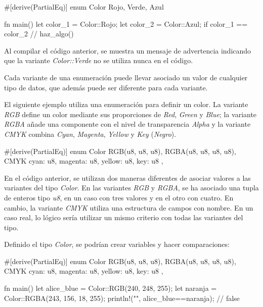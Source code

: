 \vspace{0.7em}
\begin{Codigo}
#[derive(PartialEq)]
enum Color {
   Rojo,
   Verde,
   Azul
}

fn main() {
   let color_1 = Color::Rojo;
   let color_2 = Color::Azul;  
   if color_1 == color_2 {
      // haz_algo()
   }
}
\end{Codigo} 

Al compilar el código anterior, se muestra un mensaje de advertencia indicando que la variante \textit{Color::Verde} no se utiliza nunca en el código. 

Cada variante de una enumeración puede llevar asociado un valor de cualquier tipo de datos, que además puede ser diferente para cada variante.

El siguiente ejemplo utiliza una enumeración para definir un color. La variante \textit{RGB} define un color mediante sus proporciones de \textit{Red}, \textit{Green} y \textit{Blue}; la variante \textit{RGBA} añade una componente con el nivel de transparencia \textit{Alpha} y la variante \textit{CMYK}  combina \textit{Cyan}, \textit{Magenta}, \textit{Yellow} y \textit{Key} (\textit{Negro}). 

\vspace{0.7em}
\begin{Codigo}
#[derive(PartialEq)]
enum Color {
   RGB(u8, u8, u8),
   RGBA(u8, u8, u8, u8),
   CMYK { cyan: u8, magenta: u8, yellow: u8, key: u8 },
}
\end{Codigo}

En el código anterior, se utilizan dos maneras diferentes de asociar valores a las variantes del tipo \textit{Color}. En las variantes \textit{RGB} y \textit{RGBA}, se ha asociado una tupla de enteros tipo \textit{u8}, en un caso con tres valores y en el otro con cuatro. En cambio, la variante \textit{CMYK} utiliza una estructura de campos con nombre. En un caso real, lo lógico sería utilizar un mismo criterio con todas las variantes del tipo.

Definido el tipo \textit{Color}, se podrían crear variables y hacer comparaciones:

\vspace{0.7em}
\begin{Codigo}
#[derive(PartialEq)]
enum Color {
   RGB(u8, u8, u8),
   RGBA(u8, u8, u8, u8),
   CMYK { cyan: u8, magenta: u8, yellow: u8, key: u8 },
}

fn main() {
   let alice_blue = Color::RGB(240, 248, 255);
   let naranja = Color::RGBA(243, 156, 18, 255);
   println!("{}", alice_blue==naranja); // false
}
\end{Codigo}

